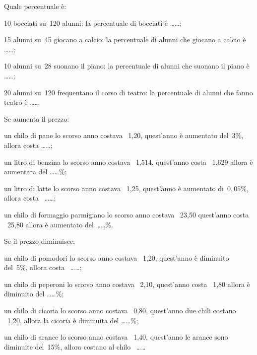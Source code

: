 \begin{esercizio}
 \label{ese:3.91}
Quale percentuale è:
\begin{enumeratea}
 \item 10 bocciati su~120 alunni: la percentuale di bocciati è \ldots\ldots;
 \item 15 alunni su~45 giocano a calcio: la percentuale di alunni che giocano 
 a calcio è \ldots\ldots;
 \item 10 alunni su~28 suonano il piano: la percentuale di alunni che suonano 
 il piano è \ldots\ldots;
 \item 20 alunni su~120 frequentano il corso di teatro: la percentuale di 
 alunni che fanno teatro è \ldots\ldots
\end{enumeratea}
\end{esercizio}

\begin{esercizio}
 \label{ese:3.92}
Se aumenta il prezzo:
\begin{enumeratea}
 \item un chilo di pane lo scorso anno costava \officialeuro\ 1,20, quest'anno 
 è aumentato del~\(3\%\), allora costa
\ldots\ldots;
 \item un litro di benzina lo scorso anno costava \officialeuro\ 1,514, 
 quest'anno costa \officialeuro\ 1,629
 allora è aumentata del \ldots\ldots\%;
 \item un litro di latte lo scorso anno costava \officialeuro\ 1,25, 
 quest'anno è aumentato di~\(0,05\%\),
allora costa \officialeuro\ \ldots\ldots;
 \item un chilo di formaggio parmigiano lo scorso anno costava 
 \officialeuro\ 23,50 quest'anno costa \officialeuro\ 25,80
allora è aumentato del \ldots\ldots\%.
\end{enumeratea}
\end{esercizio}

\begin{esercizio}
 \label{ese:3.93}
Se il prezzo diminuisce:
\begin{enumeratea}
 \item un chilo di pomodori lo scorso anno costava \officialeuro\ 1,20, 
 quest'anno è diminuito del~5\%,
allora costa \officialeuro\ \ldots\ldots;
 \item un chilo di peperoni lo scorso anno costava \officialeuro\ 2,10, 
 quest'anno costa \officialeuro\ 1,80 allora
è diminuito del \ldots\ldots\%;
 \item un chilo di cicoria lo scorso anno costava \officialeuro\ 0,80, 
 quest'anno due chili costano \officialeuro\ 1,20,
allora la cicoria è diminuita del \ldots\ldots\%;
 \item un chilo di arance lo scorso anno costava \officialeuro\ 1,40, 
 quest'anno le arance sono diminuite del~15\%,
allora costano al chilo \officialeuro\ \ldots\ldots
\end{enumeratea}
\end{esercizio}

